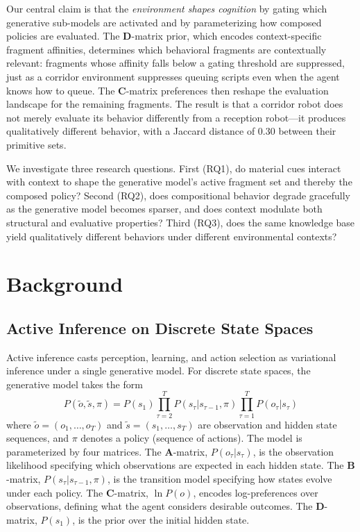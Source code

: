 \documentclass[11pt,a4paper]{article}
\newcommand{\A}{\mathbf{A}}
\newcommand{\B}{\mathbf{B}}
\newcommand{\CC}{\mathbf{C}}
\newcommand{\D}{\mathbf{D}}
\begin{document}
Our central claim is that the \emph{environment shapes cognition} by gating which generative sub-models are activated and by parameterizing how composed policies are evaluated.  The $\D$-matrix prior, which encodes context-specific fragment affinities, determines which behavioral fragments are contextually relevant: fragments whose affinity falls below a gating threshold are suppressed, just as a corridor environment suppresses queuing scripts even when the agent knows how to queue.  The $\CC$-matrix preferences then reshape the evaluation landscape for the remaining fragments.  The result is that a corridor robot does not merely evaluate its behavior differently from a reception robot---it produces qualitatively different behavior, with a Jaccard distance of 0.30 between their primitive sets.

We investigate three research questions.  First (RQ1), do material cues interact with context to shape the generative model's active fragment set and thereby the composed policy?  Second (RQ2), does compositional behavior degrade gracefully as the generative model becomes sparser, and does context modulate both structural and evaluative properties?  Third (RQ3), does the same knowledge base yield qualitatively different behaviors under different environmental contexts?


\section{Background}
\label{sec:background}

\subsection{Active Inference on Discrete State Spaces}

Active inference \citep{friston2017active,dacosta2020active,parr2022active} casts perception, learning, and action selection as variational inference under a single generative model.  For discrete state spaces, the generative model takes the form
\begin{equation}
  P(\tilde{o}, \tilde{s}, \pi) = P(s_1) \prod_{\tau=2}^{T} P(s_\tau | s_{\tau-1}, \pi) \prod_{\tau=1}^{T} P(o_\tau | s_\tau)
  \label{eq:generative-model}
\end{equation}
where $\tilde{o} = (o_1, \ldots, o_T)$ and $\tilde{s} = (s_1, \ldots, s_T)$ are observation and hidden state sequences, and $\pi$ denotes a policy (sequence of actions).  The model is parameterized by four matrices.  The $\A$-matrix, $P(o_\tau | s_\tau)$, is the observation likelihood specifying which observations are expected in each hidden state.  The $\B$-matrix, $P(s_\tau | s_{\tau-1}, \pi)$, is the transition model specifying how states evolve under each policy.  The $\CC$-matrix, $\ln P(o)$, encodes log-preferences over observations, defining what the agent considers desirable outcomes.  The $\D$-matrix, $P(s_1)$, is the prior over the initial hidden state.
\end{document}
